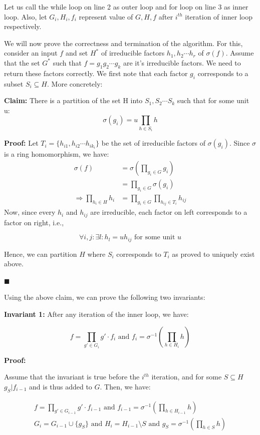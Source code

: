Let us call the while loop on line 2 as outer loop and for loop on line 3 as inner loop. Also, let $G_i, H_i, f_i$ represent value of $G, H, f$ after $i^{th}$ iteration of inner loop respectively.

We will now prove the correctness and termination of the algorithm. For this, consider an input $f$ and set $H^*$ of irreducible factors $h_1, h_2 \cdots h_r$ of $\sigma(f)$. Assume that the set $G^*$ such that $f = g_1 g_2 \cdots g_k$ are it's irreducible factors. We need to return these factors correctly. We first note that each factor $g_i$ corresponds to a subset $S_i \subseteq H$. More concretely:

\textbf{Claim: }There is a partition of the set H into $S_1, S_2 \cdots S_k$ such that for some unit u:
\[
\sigma(g_i) = u \prod_{h \in S_i} h
\]

\textbf{Proof: } Let $T_i = \{h_{i1}, h_{i2} \cdots h_{i k_i}\}$ be the set of irreducible factors of $\sigma(g_i)$. Since $\sigma$ is a ring homomorphism, we have:
\begin{align*}
    \sigma(f) &= \sigma\left(\prod_{g_i \in G} g_i\right) \\
    &= \prod_{g_i \in G} \sigma\left(g_i\right) \\
    \Rightarrow \prod_{h_i \in H} h_i &= \prod_{g_i \in G} \prod_{h_{ij} \in T_i} h_{ij}
\end{align*}
Now, since every $h_i$ and $h_{ij}$ are irreducible, each factor on left corresponds to a factor on right, i.e.,

\[
\forall i,j: \exists l: h_l = u h_{ij} \text{ for some unit } u
\]

Hence, we can partition $H$ where $S_i$ corresponds to $T_i$ as proved to uniquely exist above.

\hfill$\blacksquare$

Using the above claim, we can prove the following two invariants:

\textbf{Invariant 1: } After any iteration of the inner loop, we have:

\[
f = \prod_{g' \in G_i} g' \cdot f_i \text{ and } f_i = \sigma^{-1}\left(\prod_{h \in H_i} h\right)
\]

\textbf{Proof: }

Assume that the invariant is true before the $i^{th}$ iteration, and for some $S \subseteq H$ $g_S \vert f_{i-1}$ and is thus added to $G$. Then, we have:

\begin{align*}
    f = \prod_{g' \in G_{i-1}} g' \cdot f_{i-1} \text{ and } f_{i-1} = \sigma^{-1}\left(\prod_{h \in H_{i-1}} h\right) \\
    G_i = G_{i-1} \cup \{g_S\} \text{ and } H_i = H_{i-1} \setminus S \text{ and } g_S = \sigma^{-1}\left(\prod_{h \in S} h\right)
\end{align*}

